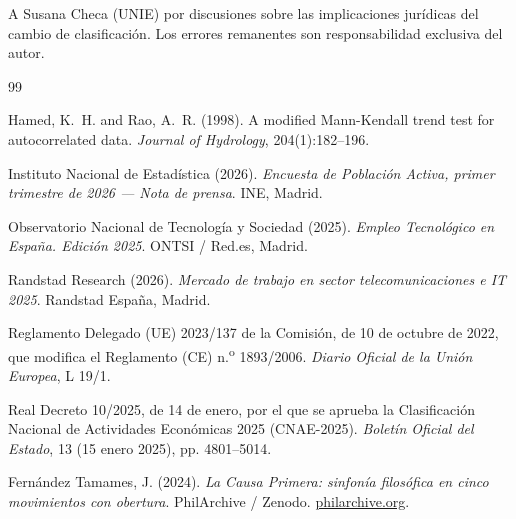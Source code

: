 \documentclass[11pt,a4paper]{article}
\begin{document}
A Susana Checa (UNIE) por discusiones sobre las implicaciones jurídicas del
cambio de clasificación. Los errores remanentes son responsabilidad exclusiva
del autor.


\begin{thebibliography}{99}

Hamed, K.~H. and Rao, A.~R. (1998).
A modified Mann-Kendall trend test for autocorrelated data.
\textit{Journal of Hydrology}, 204(1):182--196.

Instituto Nacional de Estadística (2026).
\textit{Encuesta de Población Activa, primer trimestre de 2026 --- Nota de prensa}.
INE, Madrid.

Observatorio Nacional de Tecnología y Sociedad (2025).
\textit{Empleo Tecnológico en España. Edición 2025}.
ONTSI / Red.es, Madrid.

Randstad Research (2026).
\textit{Mercado de trabajo en sector telecomunicaciones e IT 2025}.
Randstad España, Madrid.

Reglamento Delegado (UE) 2023/137 de la Comisión, de 10 de octubre de 2022,
que modifica el Reglamento (CE) n.\textsuperscript{o} 1893/2006.
\textit{Diario Oficial de la Unión Europea}, L 19/1.

Real Decreto 10/2025, de 14 de enero, por el que se aprueba la Clasificación
Nacional de Actividades Económicas 2025 (CNAE-2025).
\textit{Boletín Oficial del Estado}, 13 (15 enero 2025), pp. 4801--5014.

Fernández Tamames, J. (2024).
\textit{La Causa Primera: sinfonía filosófica en cinco movimientos con obertura}.
PhilArchive / Zenodo. \href{https://philarchive.org/}{philarchive.org}.

\end{thebibliography}
\end{document}
